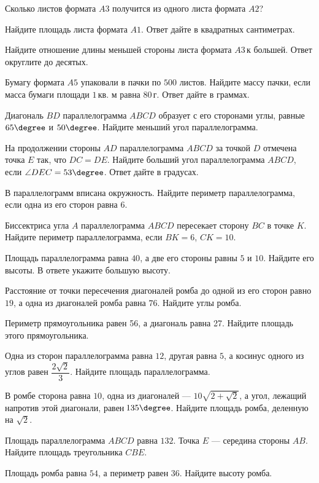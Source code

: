 \begin{class}[number=1]
\begin{listofex}
		\item Сколько листов формата \( A3 \) получится из одного листа формата \( A2 \)?
		\item Найдите площадь листа формата \( A1 \). Ответ дайте в квадратных сантиметрах.
		\item Найдите отношение длины меньшей стороны листа формата \( A3 \) к большей. Ответ округлите до десятых.
		\item Бумагу формата \( A5 \) упаковали в пачки по \( 500 \) листов. Найдите массу пачки, если масса бумаги площади \( 1 \) кв. м равна \( 80 \) г. Ответ дайте в граммах.
		\item Диагональ \( BD \) параллелограмма \( ABCD \) образует с его сторонами углы, равные \( 65\degree \) и \( 50\degree \). Найдите меньший угол параллелограмма.
		\item На продолжении стороны \( AD \) параллелограмма \( ABCD \) за точкой \( D \) отмечена точка \( E \) так, что \( DC=DE \). Найдите больший угол параллелограмма \( ABCD \), если \( \angle DEC=53\degree \). Ответ дайте в градусах.
		\item В параллелограмм вписана окружность. Найдите периметр параллелограмма, если одна из его сторон равна \( 6 \).
		\item Биссектриса угла \( A \) параллелограмма \( ABCD \) пересекает сторону \( BC \) в точке \( K \). Найдите периметр параллелограмма, если \( BK=6 \), \( CK=10 \).
		\item Площадь параллелограмма равна \( 40 \), а две его стороны равны \( 5 \) и \( 10 \). Найдите его высоты. В ответе укажите большую высоту.
		\item Расстояние от точки пересечения диагоналей ромба до одной из его сторон равно \( 19 \), а одна из диагоналей ромба равна \( 76 \). Найдите углы ромба.
		\item Периметр прямоугольника равен 56, а диагональ равна 27. Найдите площадь этого прямоугольника.
		\item Одна из сторон параллелограмма равна \( 12 \), другая равна \( 5 \), а косинус одного из углов равен \( \dfrac{2\sqrt{2}}{3} \). Найдите площадь параллелограмма.
		\item В ромбе сторона равна \( 10 \), одна из диагоналей --- \( 10\sqrt{2+\sqrt{2}} \), а угол, лежащий напротив этой диагонали, равен \( 135\degree \). Найдите площадь ромба, деленную на \( \sqrt{2} \).
		\item Площадь параллелограмма \( ABCD \) равна \( 132 \). Точка \( E \) --- середина стороны \( AB \). Найдите площадь треугольника \( CBE \).
		\item Площадь ромба равна \( 54 \), а периметр равен \( 36 \). Найдите высоту ромба.
	\end{listofex}
\end{class}

